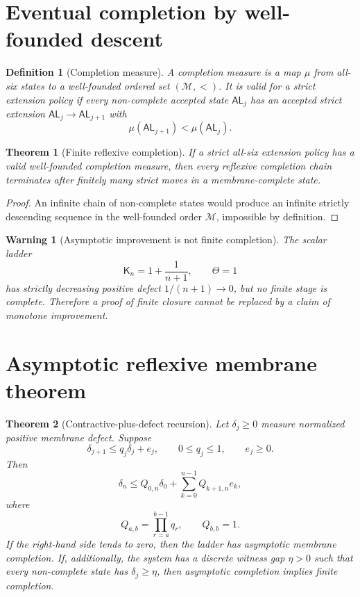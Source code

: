 \documentclass[11pt]{article}
\newtheorem{theorem}{Theorem}
\newtheorem{definition}{Definition}
\newtheorem{warning}{Warning}
\newcommand{\Kmat}{\mathsf K}
\newcommand{\Tbud}{\Theta}
\newcommand{\ALrec}{\mathsf{AL}}
\begin{document}
\section{Eventual completion by well-founded descent}
\begin{definition}[Completion measure]
A completion measure is a map \(\mu\) from all-six states to a well-founded ordered set \((\mathcal M,<)\).  It is valid for a strict extension policy if every non-complete accepted state \(\ALrec_j\) has an accepted strict extension \(\ALrec_j\to\ALrec_{j+1}\) with
\[
  \mu(\ALrec_{j+1})<\mu(\ALrec_j).
\]
\end{definition}

\begin{theorem}[Finite reflexive completion]
If a strict all-six extension policy has a valid well-founded completion measure, then every reflexive completion chain terminates after finitely many strict moves in a membrane-complete state.
\end{theorem}

\begin{proof}
An infinite chain of non-complete states would produce an infinite strictly descending sequence in the well-founded order \(\mathcal M\), impossible by definition.
\end{proof}

\begin{warning}[Asymptotic improvement is not finite completion]
The scalar ladder
\[
  \Kmat_n=1+\frac1{n+1},\qquad \Tbud=1
\]
has strictly decreasing positive defect \(1/(n+1)\to0\), but no finite stage is complete.  Therefore a proof of finite closure cannot be replaced by a claim of monotone improvement.
\end{warning}

\section{Asymptotic reflexive membrane theorem}
\begin{theorem}[Contractive-plus-defect recursion]
Let \(\delta_j\ge0\) measure normalized positive membrane defect.  Suppose
\[
  \delta_{j+1}\le q_j\delta_j+e_j,
  \qquad 0\le q_j\le1,
  \qquad e_j\ge0.
\]
Then
\[
  \delta_n\le Q_{0,n}\delta_0+
  \sum_{k=0}^{n-1}Q_{k+1,n}e_k,
\]
where
\[
  Q_{a,b}=\prod_{r=a}^{b-1}q_r,
  \qquad Q_{b,b}=1.
\]
If the right-hand side tends to zero, then the ladder has asymptotic membrane completion.  If, additionally, the system has a discrete witness gap \(\eta>0\) such that every non-complete state has \(\delta_j\ge\eta\), then asymptotic completion implies finite completion.
\end{theorem}
\end{document}
